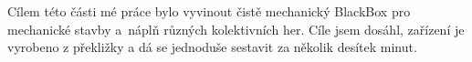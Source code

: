 Cílem této části mé práce bylo vyvinout čistě mechanický BlackBox pro mechanické stavby a~náplň různých 
kolektivních her. 
Cíle jsem dosáhl, zařízení je vyrobeno z překližky a dá se jednoduše sestavit za několik desítek minut. 
